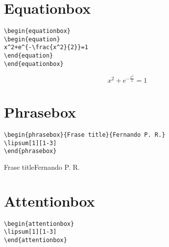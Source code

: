 
\section{Equationbox}

\begin{highlightbox}
\begin{verbatim}
\begin{equationbox}
\begin{equation}
x^2+e^{-\frac{x^2}{2}}=1
\end{equation}
\end{equationbox}
\end{verbatim}
\end{highlightbox}
\begin{equationbox}
\begin{equation}
x^2+e^{-\frac{x^2}{2}}=1
\end{equation}
\end{equationbox}


\section{Phrasebox}
\begin{highlightbox}
\begin{verbatim}
\begin{phrasebox}{Frase title}{Fernando P. R.}
\lipsum[1][1-3]
\end{phrasebox}
\end{verbatim}
\end{highlightbox}
\begin{phrasebox}{Frase title}{Fernando P. R.}
\lipsum[1][1-3]
\end{phrasebox}

\section{Attentionbox}

\lipsum[1][1-3]
\begin{highlightbox}
\begin{verbatim}
\begin{attentionbox}
\lipsum[1][1-3] 
\end{attentionbox}
\end{verbatim}
\end{highlightbox}
\begin{attentionbox}
\lipsum[1][1-3] 
\end{attentionbox}


